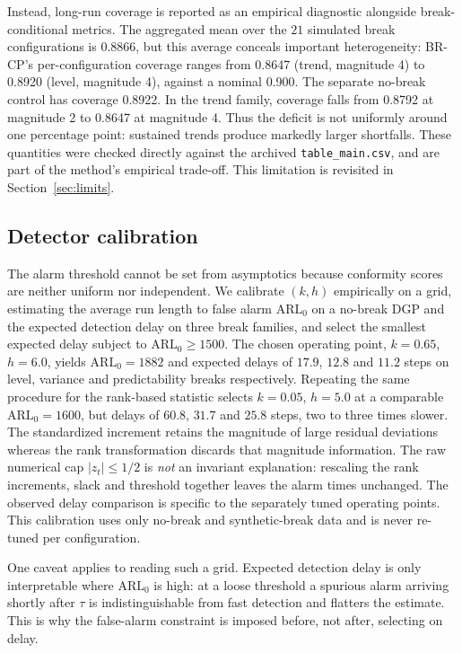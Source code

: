 \documentclass[10pt]{article}
\newcommand{\brcp}{\textsc{BR-CP}}
\begin{document}
Instead, long-run coverage is reported as an empirical diagnostic alongside break-conditional metrics. The aggregated mean over the $21$ simulated break configurations is 0.8866, but this average conceals important heterogeneity: \brcp{}'s per-configuration coverage ranges from 0.8647 (trend, magnitude 4) to 0.8920 (level, magnitude 4), against a nominal 0.900. The separate no-break control has coverage 0.8922. In the trend family, coverage falls from 0.8792 at magnitude 2 to 0.8647 at magnitude 4. Thus the deficit is not uniformly around one percentage point: sustained trends produce markedly larger shortfalls. These quantities were checked directly against the archived \texttt{table\_main.csv}, and are part of the method's empirical trade-off. This limitation is revisited in Section~\ref{sec:limits}.

\subsection{Detector calibration}

The alarm threshold cannot be set from asymptotics because conformity scores are
neither uniform nor independent. We calibrate $(k,h)$ empirically on a grid,
estimating the average run length to false alarm $\mathrm{ARL}_0$ on a no-break
DGP and the expected detection delay on three break families, and select the
smallest expected delay subject to $\mathrm{ARL}_0 \ge 1500$. The chosen
operating point, $k=0.65$, $h=6.0$, yields $\mathrm{ARL}_0 = 1882$ and expected
delays of $17.9$, $12.8$ and $11.2$ steps on level, variance and predictability
breaks respectively. Repeating the same procedure for the rank-based
statistic selects $k=0.05$, $h=5.0$ at a comparable
$\mathrm{ARL}_0 = 1600$, but delays of $60.8$, $31.7$ and $25.8$ steps, two
to three times slower. The standardized increment retains the magnitude of large residual deviations whereas the rank transformation discards that magnitude information. The raw numerical cap $|z_t|\le 1/2$ is \emph{not} an invariant explanation: rescaling the rank increments, slack and threshold together leaves the alarm times unchanged. The observed delay comparison is specific to the separately tuned operating points. This calibration uses only no-break and
synthetic-break data and is never re-tuned per configuration.

One caveat applies to reading such a grid. Expected detection delay is only
interpretable where $\mathrm{ARL}_0$ is high: at a loose threshold a spurious
alarm arriving shortly after $\tau$ is indistinguishable from fast detection
and flatters the estimate. This is why the false-alarm constraint is imposed
before, not after, selecting on delay.
\end{document}
